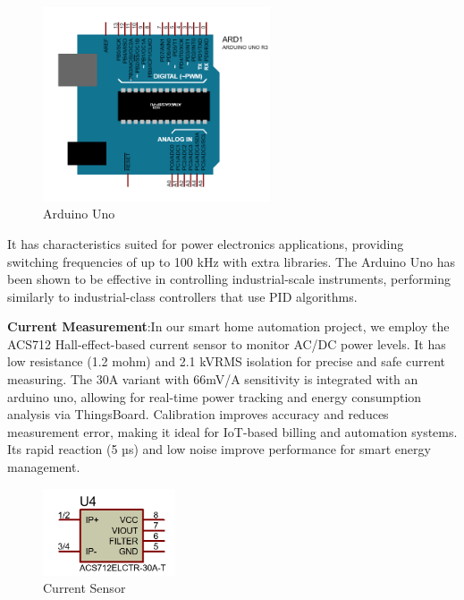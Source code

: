 \documentclass[a4paper,12pt]{report}
\begin{document}
\begin{figure}[H]
    \centering
    \includegraphics[width=0.6\textwidth]{Capture.PNG} %
    \caption{Arduino Uno}
    \label{fig:uno} %

\end{figure}
It has characteristics suited for power electronics applications, providing switching frequencies of up to 100 kHz with extra libraries\cite{muller2015using}.  The Arduino Uno has been shown to be effective in controlling industrial-scale instruments, performing similarly to industrial-class controllers that use PID algorithms\cite{Taufiq_2020}.

\textbf{Current Measurement}:In our smart home automation project, we employ the ACS712 Hall-effect-based current sensor to monitor AC/DC power levels. It has low resistance (1.2 mohm) and 2.1 kVRMS isolation for precise and safe current measuring. The 30A variant with 66mV/A sensitivity is integrated with an arduino uno, allowing for real-time power tracking and energy consumption analysis via ThingsBoard.  Calibration improves accuracy and reduces measurement error, making it ideal for IoT-based billing and automation systems.  Its rapid reaction (5 µs) and low noise improve performance for smart energy management.
\begin{figure}[H]
    \centering
    \includegraphics[width=0.35\textwidth]{ACS.PNG} %
    \caption{Current Sensor}
\end{figure}
\end{document}
